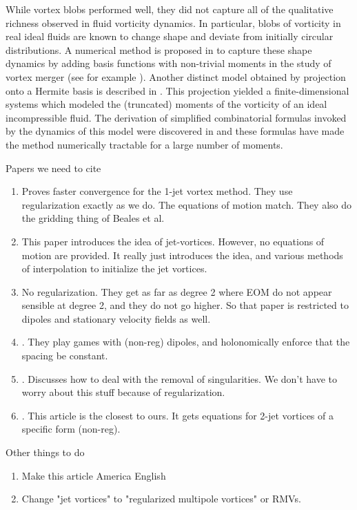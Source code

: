 \documentclass[12pt]{amsart}
\theoremstyle{remark}
\begin{document}
While vortex blobs performed well, they did not capture all of the qualitative richness observed in fluid vorticity dynamics.
In particular, blobs of vorticity in real ideal fluids are known to change shape and deviate from initially circular distributions.
A numerical method is proposed in \cite{Rossi1997,Rossi2005} to capture these shape dynamics by adding
basis functions with non-trivial moments in the study of vortex merger (see for example \cite{MelanderZabuskyMcWilliams1998,DizesVerga2002,MeunierDizesLeweke2005}).
Another distinct model obtained by projection onto a Hermite basis is described in \cite{NagemSandriUminskyWayne2009}.
This projection yielded a finite-dimensional systems which modeled the (truncated) moments of the vorticity of an ideal incompressible fluid.
The derivation of simplified combinatorial formulas invoked by the dynamics of this model were discovered in \cite{UminskyWayneBarbaro2010}
and these formulas have made the method numerically tractable for a large number of moments.

{\color{ blue}
Papers we need to cite
\begin{enumerate}
	\item \cite{ChiuNivolaides1988} Proves faster convergence for the 1-jet vortex method.  They use regularization exactly as we do.  The equations of motion match.   They also do the gridding thing of Beales et al.
	\item \cite{Nicolaides1986} This paper introduces the idea of jet-vortices.  However, no equations of motion are provided.  It really just introduces the idea, and various methods of interpolation to initialize the jet vortices.
	\item \cite{TurYanovskyKonstantin2011} No regularization.  They get as far as degree 2 where EOM do not appear sensible at degree 2, and they do not go higher.  So that paper is restricted to dipoles
	and stationary velocity fields as well.
	\item \cite{TchieuKansoNewton2012}.  They play games with (non-reg) dipoles, and holonomically enforce that the spacing be constant.
	\item \cite{Smith2011}.  Discusses how to deal with the removal of singularities.  We don't have to worry about this stuff because of regularization.
	\item \cite{Chefranov1991}.  This article is the closest to ours.  It gets equations for 2-jet vortices of a specific form (non-reg).
\end{enumerate}

Other things to do
\begin{enumerate}
	\item Make this article America English
	\item Change "jet vortices" to "regularized multipole vortices" or RMVs.
\end{enumerate}
}
\end{document}
